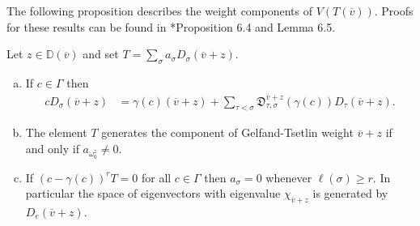 \documentclass[11pt,fleqn]{amsart}
\newcommand\vv{\overline{v}}
\newcommand\DD{\mathbb D}
\newcommand\D{\mathfrak D}
\begin{document}
The following proposition describes the weight components of $V(T(\vv))$. 
Proofs for these results can be found in \cite{FGRZ18}*{Proposition 6.4 and
Lemma 6.5}.
\begin{Proposition}
\label{P:gt-weight-spaces}
Let $z \in \DD(\vv)$ and set $T = \sum_\sigma a_\sigma D_\sigma(\vv + z)$.
\begin{enumerate}[(a)]
\item 
\label{i:action}
If $c \in \Gamma$ then
\begin{align*}
c D_\sigma(\vv + z)
	&= \gamma(c)(\vv+z) +
		\sum_{\tau < \sigma} \D_{\tau,\sigma}^{\vv + z}(\gamma(c)) 
			D_\tau(\vv+z).
\end{align*}

\item 
\label{i:generator}
The element $T$ generates the component of Gelfand-Tsetlin weight $\vv+z$
if and only if $a_{\omega_0^z} \neq 0$.

\item 
\label{i:eigenvalue}
If $(c - \gamma(c))^r T = 0$ for all $c \in \Gamma$ then $a_\sigma = 0$
whenever $\ell(\sigma) \geq r$. In particular the space of eigenvectors with
eigenvalue $\chi_{\vv + z}$ is generated by $D_e(\vv + z)$.
\end{enumerate}
\end{Proposition}
\end{document}
